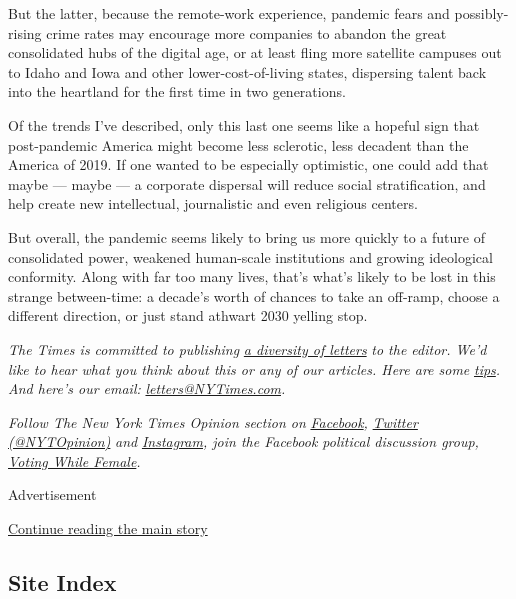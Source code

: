 But the latter, because the remote-work experience, pandemic fears and
possibly-rising crime rates may encourage more companies to abandon the
great consolidated hubs of the digital age, or at least fling more
satellite campuses out to Idaho and Iowa and other lower-cost-of-living
states, dispersing talent back into the heartland for the first time in
two generations.

Of the trends I've described, only this last one seems like a hopeful
sign that post-pandemic America might become less sclerotic, less
decadent than the America of 2019. If one wanted to be especially
optimistic, one could add that maybe --- maybe --- a corporate dispersal
will reduce social stratification, and help create new intellectual,
journalistic and even religious centers.

But overall, the pandemic seems likely to bring us more quickly to a
future of consolidated power, weakened human-scale institutions and
growing ideological conformity. Along with far too many lives, that's
what's likely to be lost in this strange between-time: a decade's worth
of chances to take an off-ramp, choose a different direction, or just
stand athwart 2030 yelling stop.

\emph{The Times is committed to publishing}
\href{https://www.nytimes3xbfgragh.onion/2019/01/31/opinion/letters/letters-to-editor-new-york-times-women.html}{\emph{a
diversity of letters}} \emph{to the editor. We'd like to hear what you
think about this or any of our articles. Here are some}
\href{https://help.nytimes3xbfgragh.onion/hc/en-us/articles/115014925288-How-to-submit-a-letter-to-the-editor}{\emph{tips}}\emph{.
And here's our email:}
\href{mailto:letters@NYTimes.com}{\emph{letters@NYTimes.com}}\emph{.}

\emph{Follow The New York Times Opinion section on}
\href{https://www.facebookcorewwwi.onion/nytopinion}{\emph{Facebook}}\emph{,}
\href{http://twitter.com/NYTOpinion}{\emph{Twitter (@NYTOpinion)}}
\emph{and}
\href{https://www.instagram.com/nytopinion/}{\emph{Instagram}}\emph{,
join the Facebook political discussion group,}
\href{https://www.facebookcorewwwi.onion/groups/votingwhilefemale/}{\emph{Voting
While Female}}\emph{.}

Advertisement

\protect\hyperlink{after-bottom}{Continue reading the main story}

\hypertarget{site-index}{%
\subsection{Site Index}\label{site-index}}

